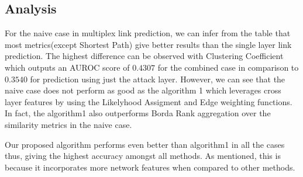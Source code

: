 \subsection{Analysis}

For the naive case in multiplex link prediction, we can infer from the table
that most metrics(except Shortest Path) give  better results than the single
layer link prediction. The highest difference can be observed with Clustering
Coefficient  which outputs an AUROC score of $0.4307$ for the combined case in
comparison to $0.3540$ for prediction using just the attack layer. However, we
can  see that the naive case does not perform as good as the algorithm 1 which
leverages  cross layer features by using the Likelyhood Assigment and Edge
weighting functions. In fact,  the algorithm1 also outperforms Borda Rank
aggregation over the similarity metrics in the naive case.

Our proposed algorithm performs even better than algorithm1 in all the cases
thus,  giving the highest accuracy amongst all methods. As mentioned, this is
because it  incorporates more network features when compared to other methods.











